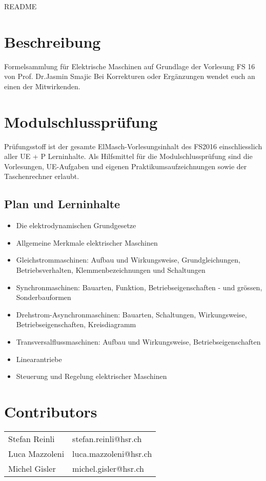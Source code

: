 \thispagestyle{empty}
\setcounter{page}{0} %
{\huge README }
\section*{Beschreibung}
Formelsammlung für Elektrische Maschinen auf Grundlage der Vorlesung FS 16 von Prof. Dr.Jasmin Smajic \newline
Bei Korrekturen oder Ergänzungen wendet euch an einen der Mitwirkenden.

\section*{Modulschlussprüfung}
Prüfungsstoff ist der gesamte ElMasch-Vorlesungsinhalt des FS2016 einschliesslich aller UE + P Lerninhalte.\newline
Als Hilfsmittel für die Modulschlussprüfung sind die Vorlesungen,\newline
UE-Aufgaben und eigenen Praktikumsaufzeichnungen sowie der Taschenrechner erlaubt.

\subsection*{Plan und Lerninhalte}
{\scriptsize 
\begin{itemize}
    \item Die elektrodynamischen Grundgesetze 
    \item Allgemeine Merkmale elektrischer Maschinen 
    \item Gleichstrommaschinen: 
    \subitem Aufbau und Wirkungsweise, Grundgleichungen, Betriebsverhalten, Klemmenbezeichnungen und Schaltungen 
    \item Synchronmaschinen: Bauarten, Funktion, Betriebseigenschaften - und grössen, Sonderbauformen 
    \item Drehstrom-Asynchronmaschinen: 
    \subitem Bauarten, Schaltungen, Wirkungsweise, Betriebseigenschaften, Kreisdiagramm 
    \item Transversalflussmaschinen: Aufbau und Wirkungsweise, Betriebseigenschaften
    \item Linearantriebe
    \item Steuerung und Regelung elektrischer Maschinen
\end{itemize}
}
\vfill
\section*{Contributors}
\begin{tabular}{ll}
    Stefan Reinli & stefan.reinli@hsr.ch \\ 
    Luca Mazzoleni& luca.mazzoleni@hsr.ch \\ 
    Michel Gisler& michel.gisler@hsr.ch \\ 
\end{tabular} 

